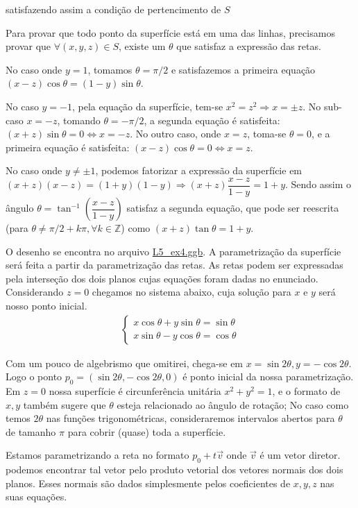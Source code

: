 \documentclass[12pt,letterpaper]{article}
\begin{document}
 satisfazendo assim a condição de pertencimento de $S$
 
 Para provar que todo ponto da superfície está em uma das linhas, precisamos provar que $\forall (x,y,z)\in S$, existe um $\theta$ que satisfaz a expressão das retas.
 
 No caso onde $y=1$, tomamos $\theta = \pi/2$ e satisfazemos a primeira equação $(x-z)\cos\theta=(1-y)\sin\theta$.
 
 No caso $y=-1$, pela equação da superfície, tem-se $x^2=z^2\Rightarrow x=\pm z$. No sub-caso $x=-z$, tomando $\theta=-\pi/2$, a segunda equação é satisfeita: $(x+z)\sin\theta=0\Leftrightarrow x=-z$. No outro caso, onde $x=z$, toma-se $\theta=0$, e a primeira equação é satisfeita: $(x-z)\cos\theta=0\Leftrightarrow x=z$.
 
 No caso onde $y\neq \pm 1$, podemos fatorizar a expressão da superfície em $(x+z)(x-z)=(1+y)(1-y)\Rightarrow(x+z)\dfrac{x-z}{1-y}=1+y$. Sendo assim o ângulo $\theta=\tan^{-1}\left(\dfrac{x-z}{1-y}\right)$ satisfaz a segunda equação, que pode ser reescrita (para $\theta\neq \pi/2+k\pi,\forall k \in \mathbb{Z}$) como $(x+z)\tan\theta=1+y$.
 
 O desenho se encontra no arquivo \href{https://github.com/reneroliveira/Curves_and_Surfaces/blob/main/ggb_files/L5_ex4.ggb}{L5\_ex4.ggb}. A parametrização da superfície será feita a partir da parametrização das retas. As retas podem ser expressadas pela interseção dos dois planos cujas equações foram dadas no enunciado. Considerando $z=0$ chegamos no sistema abaixo, cuja solução para $x$ e $y$ será nosso ponto inicial.
\begin{align*}
	\begin{cases}
		x\cos\theta+y\sin\theta=\sin\theta\\
		x\sin\theta-y\cos\theta=\cos\theta
	\end{cases}
\end{align*}

Com um pouco de algebrismo que omitirei, chega-se em $x=\sin2\theta,y=-\cos2\theta$. Logo o ponto $p_0=(\sin2\theta,-\cos2\theta,0)$ é ponto inicial da nossa parametrização. Em $z=0$ nossa superfície é circunferência unitária $x^2+y^2=1$, e o formato de $x,y$ também sugere que $\theta$ esteja relacionado ao ângulo de rotação; No caso como temos $2\theta$ nas funções trigonométricas, consideraremos intervalos abertos para $\theta$ de tamanho $\pi$ para cobrir (quase) toda a superfície.

Estamos parametrizando a reta no formato $p_0+t\vec v$ onde $\vec v$ é um vetor diretor. podemos encontrar tal vetor pelo produto vetorial dos vetores normais dos dois planos. Esses normais são dados simplesmente pelos coeficientes de $x,y,z$ nas suas equações.
\end{document}
